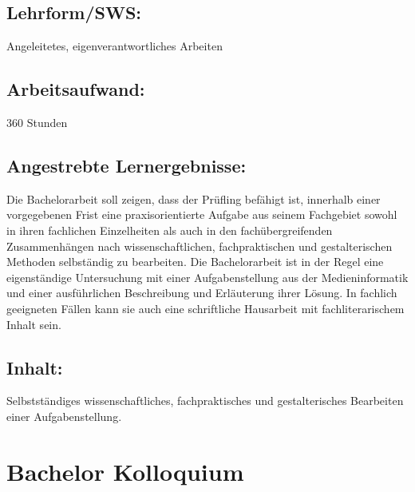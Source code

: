 \section*{Lehrform/SWS:}\label{lehrformsws-3}

Angeleitetes, eigenverantwortliches Arbeiten

\section*{Arbeitsaufwand:}\label{arbeitsaufwand-3}

360 Stunden

\section*{Angestrebte
Lernergebnisse:}\label{angestrebte-lernergebnisse-3}

Die Bachelorarbeit soll zeigen, dass der Prüfling befähigt ist,
innerhalb einer vorgegebenen Frist eine praxisorientierte Aufgabe aus
seinem Fachgebiet sowohl in ihren fachlichen Einzelheiten als auch in
den fachübergreifenden Zusammenhängen nach wissenschaftlichen,
fachpraktischen und gestalterischen Methoden selbständig zu bearbeiten.
Die Bachelorarbeit ist in der Regel eine eigenständige Untersuchung mit
einer Aufgabenstellung aus der Medieninformatik und einer ausführlichen
Beschreibung und Erläuterung ihrer Lösung. In fachlich geeigneten Fällen
kann sie auch eine schriftliche Hausarbeit mit fachliterarischem Inhalt
sein.

\section*{Inhalt:}\label{inhalt-3}

Selbstständiges wissenschaftliches, fachpraktisches und gestalterisches
Bearbeiten einer Aufgabenstellung.

\chapter{Bachelor Kolloquium}\label{bachelor-kolloquium}

